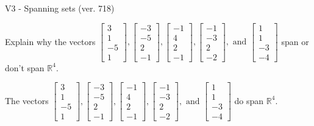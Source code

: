 \begin{exercise}
  \begin{exerciseTitle}V3 - Spanning sets (ver. 718)\end{exerciseTitle}
  \begin{exerciseStatement}
    Explain why the vectors \(\left[\begin{array}{r}
3 \\
1 \\
-5 \\
1
\end{array}\right] , \left[\begin{array}{r}
-3 \\
-5 \\
2 \\
-1
\end{array}\right] , \left[\begin{array}{r}
-1 \\
4 \\
2 \\
-1
\end{array}\right] , \left[\begin{array}{r}
-1 \\
-3 \\
2 \\
-2
\end{array}\right] , \text{ and } \left[\begin{array}{r}
1 \\
1 \\
-3 \\
-4
\end{array}\right]\) span or don't span \(\mathbb{R}^4\). 
	


  \end{exerciseStatement}
  \begin{exerciseAnswer}
   The vectors \(\left[\begin{array}{r}
3 \\
1 \\
-5 \\
1
\end{array}\right] , \left[\begin{array}{r}
-3 \\
-5 \\
2 \\
-1
\end{array}\right] , \left[\begin{array}{r}
-1 \\
4 \\
2 \\
-1
\end{array}\right] , \left[\begin{array}{r}
-1 \\
-3 \\
2 \\
-2
\end{array}\right] , \text{ and } \left[\begin{array}{r}
1 \\
1 \\
-3 \\
-4
\end{array}\right]\) 
  	 do  
	span \(\mathbb{R}^4\).
  



\end{exerciseAnswer}
\end{exercise}
